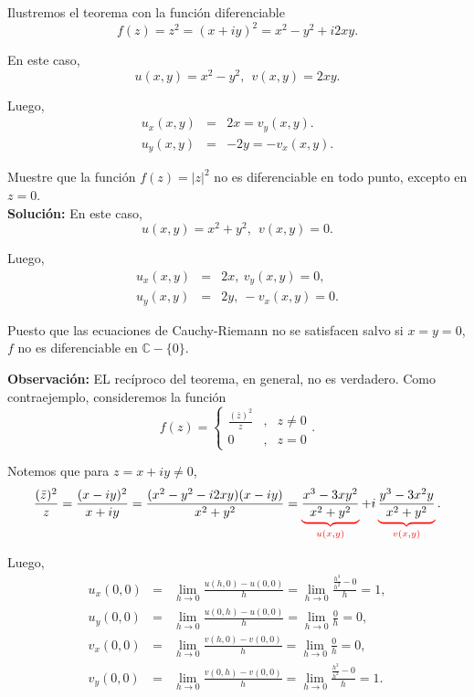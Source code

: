 \begin{ejemplo}
Ilustremos el teorema con la función diferenciable 
$$f(z) = z^2 = (x+iy)^2 =  x^2 - y^2 + i2xy. $$

 En este caso, 
$$u(x,y) = x^2-y^2, ~~ v(x,y) = 2xy.$$

Luego,
\begin{eqnarray*}
u_x(x,y) &=& 2x = v_y(x,y) . \\
u_y(x,y) &=& -2y = -v_x(x,y) .
\end{eqnarray*}
\end{ejemplo}

\begin{ejemplo}
Muestre que la función $f(z) = |z|^2$ no es diferenciable en todo punto, excepto en $z = 0$.
\\

\textbf{Solución:} En este caso,
$$u(x,y) = x^2+y^2, ~~ v(x,y) = 0.$$

Luego,
\begin{eqnarray*}
u_x(x,y) &=& 2x, ~  v_y(x,y) = 0, \\
u_y(x,y) &=& 2y, ~ -v_x(x,y) = 0.
\end{eqnarray*}

Puesto que las ecuaciones de Cauchy-Riemann no se satisfacen salvo si $x = y = 0$, $f$ no es diferenciable en $\mathbb{C} - \{0\}$.
\end{ejemplo}

\textbf{Observación:} EL recíproco del teorema, en general, no es verdadero. Como contraejemplo, consideremos la función
$$f(z) = \left\{ \begin{array}{cll}
\frac{(\bar{z})^2}{z} &,& z \neq 0 \\
0 &,& z = 0
\end{array} \right. .$$

Notemos que para $z = x+iy \neq 0$,
$$\frac{(\bar{z})^2}{z} = \frac{(x-iy)^2}{x+iy} = \frac{(x^2-y^2 -i2xy)(x-iy)}{x^2+y^2} = \color{red} \underbrace{ \color{black} \frac{x^3 - 3xy^2}{x^2+y^2}}_{ \color{red}  u(x,y)} \color{black} + i \color{red} \underbrace{\color{black}\frac{y^3-3x^2y}{x^2+y^2}}_{\color{red} v(x,y)}\color{black}.$$

Luego,
\begin{eqnarray*}
u_x(0,0) &=& \lim_{h \to 0} \frac{u(h,0) - u(0,0)}{h} 
= \lim_{h \to 0} \frac{\frac{h^3}{h^2} - 0}{h} 
 = 1, \\
u_y(0,0) &=& \lim_{h \to 0} \frac{u(0,h) - u(0,0)}{h} 
= \lim_{h \to 0} \frac{0}{h} = 0, \\
v_x(0,0) &=& \lim_{h \to 0} \frac{v(h,0) - v(0,0)}{h} 
= \lim_{h \to 0} \frac{0}{h} = 0, \\
v_y(0,0) &=& \lim_{h \to 0} \frac{v(0,h) - v(0,0)}{h} 
= \lim_{h \to 0} \frac{\frac{h^3}{h^2} - 0}{h} = 1.
\end{eqnarray*}

